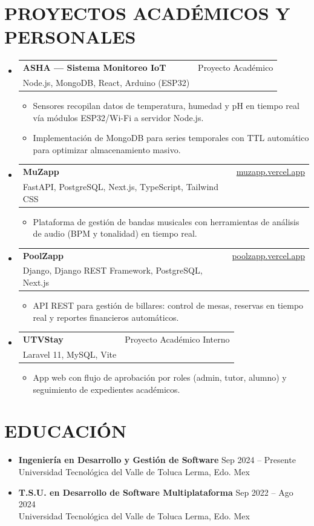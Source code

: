 \documentclass[letterpaper,11pt]{article}
\makeatletter
\newcommand{\resumeSubheading}[4]{
  \vspace{-1pt}\item
    \begin{tabular*}{0.97\textwidth}[t]{l@{\extracolsep{\fill}}r}
      \textbf{#1} & \small #2 \\
      \small#3 & \small #4 \\
    \end{tabular*}\vspace{-6pt}
}
\newcommand{\resumeItemListStart}{\begin{itemize}[leftmargin=0.15in, label={$\circ$}]}
\newcommand{\resumeItemListEnd}{\end{itemize}\vspace{-3pt}}
\makeatother
\begin{document}
\section{PROYECTOS ACADÉMICOS Y PERSONALES}
  \begin{itemize}[leftmargin=0.15in, label={}]
    \resumeSubheading
      {ASHA — Sistema Monitoreo IoT}{Proyecto Académico}
      {Node.js, MongoDB, React, Arduino (ESP32)}{}
      \resumeItemListStart
        \item Sensores recopilan datos de temperatura, humedad y pH en tiempo real vía módulos ESP32/Wi-Fi a servidor Node.js.
        \item Implementación de MongoDB para series temporales con TTL automático para optimizar almacenamiento masivo.
      \resumeItemListEnd

    \resumeSubheading
      {MuZapp}{\href{https://muzapp.vercel.app}{muzapp.vercel.app}}
      {FastAPI, PostgreSQL, Next.js, TypeScript, Tailwind CSS}{}
      \resumeItemListStart
        \item Plataforma de gestión de bandas musicales con herramientas de análisis de audio (BPM y tonalidad) en tiempo real.
      \resumeItemListEnd

    \resumeSubheading
      {PoolZapp}{\href{https://poolzapp.vercel.app}{poolzapp.vercel.app}}
      {Django, Django REST Framework, PostgreSQL, Next.js}{}
      \resumeItemListStart
        \item API REST para gestión de billares: control de mesas, reservas en tiempo real y reportes financieros automáticos.
      \resumeItemListEnd

    \resumeSubheading
      {UTVStay}{Proyecto Académico Interno}
      {Laravel 11, MySQL, Vite}{}
      \resumeItemListStart
        \item App web con flujo de aprobación por roles (admin, tutor, alumno) y seguimiento de expedientes académicos.
      \resumeItemListEnd
  \end{itemize}

\vspace{-5pt}

\section{EDUCACIÓN}
  \begin{itemize}[leftmargin=0.15in, label={}]
    \item \textbf{Ingeniería en Desarrollo y Gestión de Software} \hfill Sep 2024 -- Presente \\
    Universidad Tecnológica del Valle de Toluca \hfill Lerma, Edo. Mex
    \vspace{2pt}
    \item \textbf{T.S.U. en Desarrollo de Software Multiplataforma} \hfill Sep 2022 -- Ago 2024 \\
    Universidad Tecnológica del Valle de Toluca \hfill Lerma, Edo. Mex
  \end{itemize}
\end{document}
